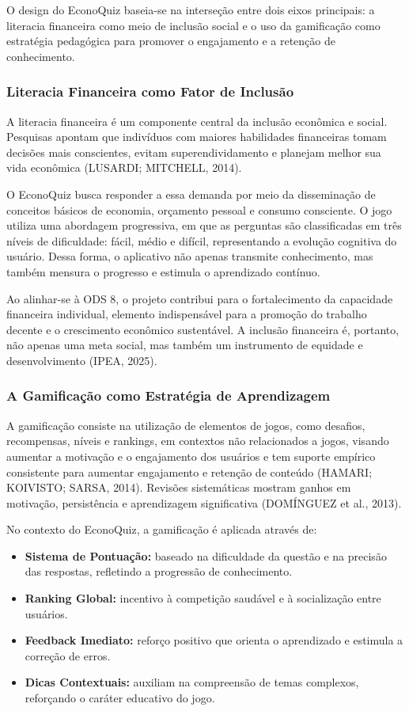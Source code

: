\documentclass[12pt,a4paper]{article}
\begin{document}
O design do EconoQuiz baseia-se na interseção entre dois eixos principais: a literacia financeira como meio de inclusão social e o uso da gamificação como estratégia pedagógica para promover o engajamento e a retenção de conhecimento.

\subsubsection{Literacia Financeira como Fator de Inclusão}

A literacia financeira é um componente central da inclusão econômica e social. Pesquisas apontam que indivíduos com maiores habilidades financeiras tomam decisões mais conscientes, evitam superendividamento e planejam melhor sua vida econômica (LUSARDI; MITCHELL, 2014).

O EconoQuiz busca responder a essa demanda por meio da disseminação de conceitos básicos de economia, orçamento pessoal e consumo consciente. O jogo utiliza uma abordagem progressiva, em que as perguntas são classificadas em três níveis de dificuldade: fácil, médio e difícil, representando a evolução cognitiva do usuário. Dessa forma, o aplicativo não apenas transmite conhecimento, mas também mensura o progresso e estimula o aprendizado contínuo.

Ao alinhar-se à ODS 8, o projeto contribui para o fortalecimento da capacidade financeira individual, elemento indispensável para a promoção do trabalho decente e o crescimento econômico sustentável. A inclusão financeira é, portanto, não apenas uma meta social, mas também um instrumento de equidade e desenvolvimento (IPEA, 2025).

\subsubsection{A Gamificação como Estratégia de Aprendizagem}

A gamificação consiste na utilização de elementos de jogos, como desafios, recompensas, níveis e rankings, em contextos não relacionados a jogos, visando aumentar a motivação e o engajamento dos usuários e tem suporte empírico consistente para aumentar engajamento e retenção de conteúdo (HAMARI; KOIVISTO; SARSA, 2014). Revisões sistemáticas mostram ganhos em motivação, persistência e aprendizagem significativa (DOMÍNGUEZ et al., 2013).

No contexto do EconoQuiz, a gamificação é aplicada através de:

\begin{itemize}
    \item \textbf{Sistema de Pontuação:} baseado na dificuldade da questão e na precisão das respostas, refletindo a progressão de conhecimento.
    \item \textbf{Ranking Global:} incentivo à competição saudável e à socialização entre usuários.
    \item \textbf{Feedback Imediato:} reforço positivo que orienta o aprendizado e estimula a correção de erros.
    \item \textbf{Dicas Contextuais:} auxiliam na compreensão de temas complexos, reforçando o caráter educativo do jogo.
\end{itemize}
\end{document}
